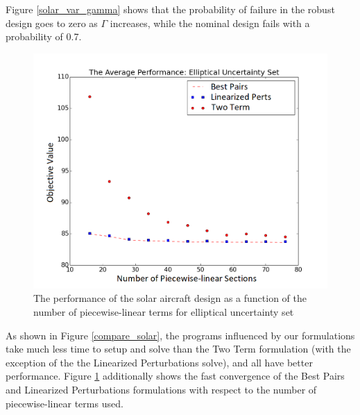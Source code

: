 Figure \ref{solar_var_gamma} shows that the probability of failure in the robust design goes to zero as $\Gamma$ increases, while the nominal design fails with a probability of 0.7.

\begin{figure}[h]
    \centering
    \captionsetup{justification=centering, font=small}
    \includegraphics[scale=0.48]{solar_results/ell_avg_pwl.png}
    \caption{The performance of the solar aircraft design as a function of the number of piecewise-linear terms for elliptical uncertainty set}
    \label{solar_var_pwl}
\end{figure}

As shown in Figure \ref{compare_solar}, the programs influenced by our formulations take much less time to  setup and solve than the Two Term formulation (with the exception of the the Linearized Perturbations solve), and all have better performance. Figure \ref{solar_var_pwl} additionally shows the fast convergence of the Best Pairs and Linearized Perturbations formulations with respect to the number of piecewise-linear terms used.
